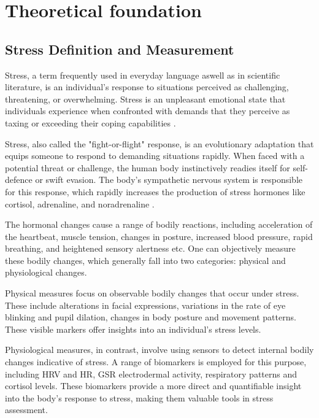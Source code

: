 \chapter{Theoretical foundation}

\section{Stress Definition and Measurement}
Stress, a term frequently used in everyday language aswell as in scientific literature, is an individual's response to situations perceived as challenging, threatening, or overwhelming. Stress is an unpleasant emotional state that individuals experience when confronted with demands that they perceive as taxing or exceeding their coping capabilities \parencite{stress2}.

Stress, also called the "fight-or-flight" response, is an evolutionary adaptation that equips someone to respond to demanding situations rapidly. When faced with a potential threat or challenge, the human body instinctively readies itself for self-defence or swift evasion. The body's sympathetic nervous system is responsible for this response, which rapidly increases the production of stress hormones like cortisol, adrenaline, and noradrenaline \parencite{1}.

The hormonal changes cause a range of bodily reactions, including acceleration of the heartbeat, muscle tension, changes in posture, increased blood pressure, rapid breathing, and heightened sensory alertness etc. One can objectively measure these bodily changes, which generally fall into two categories: physical and physiological changes.

Physical measures focus on observable bodily changes that occur under stress. These include alterations in facial expressions, variations in the rate of eye blinking and pupil dilation, changes in body posture and movement patterns. These visible markers offer insights into an individual's stress levels.

Physiological measures, in contrast, involve using sensors to detect internal bodily changes indicative of stress. A range of biomarkers is employed for this purpose, including \gls{HRV}  and \gls{HR}, \gls{GSR} electrodermal activity, respiratory patterns and cortisol levels. These biomarkers provide a more direct and quantifiable insight into the body's response to stress, making them valuable tools in stress assessment.

